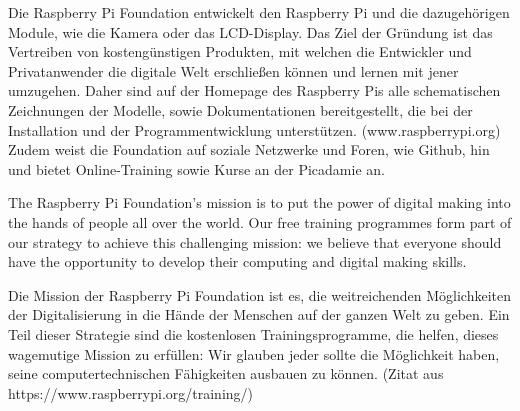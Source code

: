 \documentclass[12pt,a4paper]{report}
\begin{document}
Die Raspberry Pi Foundation entwickelt den Raspberry Pi und die dazugehörigen Module, wie die Kamera oder das LCD-Display. Das Ziel der Gründung ist das Vertreiben von kostengünstigen Produkten, mit welchen die Entwickler und Privatanwender die digitale Welt erschließen können und lernen mit jener umzugehen. Daher sind auf der Homepage des Raspberry Pis alle schematischen Zeichnungen der Modelle, sowie Dokumentationen bereitgestellt, die bei der Installation und der Programmentwicklung unterstützen. (www.raspberrypi.org)
Zudem weist die Foundation auf soziale Netzwerke und Foren, wie Github, hin und bietet Online-Training sowie Kurse an der Picadamie an.

The Raspberry Pi Foundation’s mission is to put the power of digital making into the hands of people all over the world. Our free training programmes form part of our strategy to achieve this challenging mission: we believe that everyone should have the opportunity to develop their computing and digital making skills.

Die Mission der Raspberry Pi Foundation ist es, die weitreichenden Möglichkeiten der Digitalisierung in die Hände der Menschen auf der ganzen Welt zu geben. Ein Teil dieser Strategie sind die kostenlosen Trainingsprogramme, die helfen, dieses wagemutige Mission zu erfüllen: Wir glauben jeder sollte die Möglichkeit haben, seine computertechnischen Fähigkeiten ausbauen zu können. (Zitat aus https://www.raspberrypi.org/training/)
\end{document}
